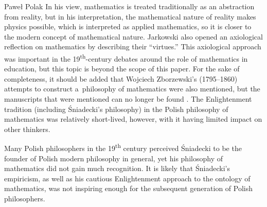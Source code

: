 \begin{artengenv}{Paweł Polak}
{ In his view, mathematics is treated traditionally as an abstraction from reality, but in his interpretation, the mathematical nature of reality makes physics possible, which is interpreted as applied mathematics, so it is closer to the modern concept of mathematical nature. Jarkowski also opened an axiological reflection on mathematics by describing their ``virtues.'' This axiological approach was important in the 19\textsuperscript{th}-century debates around the role of mathematics in education, but this topic is beyond the scope of this paper. For the sake of completeness, it should be added that Wojciech Zborzewski's (1795--1860) attempts to construct a~philosophy of mathematics were also mentioned, but the manuscripts that were mentioned can no longer be found 
\mbox{\parencites[][]{noauthor_nowiny_1845}[][p.341]{majorkiewicz_historya_1847}}. %
 } The Enlightenment tradition (including Śniadecki's philosophy) in the Polish philosophy of mathematics was relatively short-lived, however, with it having limited impact on other thinkers.

Many Polish philosophers in the 19\textsuperscript{th} century perceived Śniadecki to be the founder of Polish modern philosophy in general, yet his philosophy of mathematics did not gain much recognition. It is likely that Śniadecki's empiricism, as well as his cautious Enlightenment approach to the ontology of mathematics, was not inspiring enough for the subsequent generation of Polish philosophers.


\end{artengenv}
